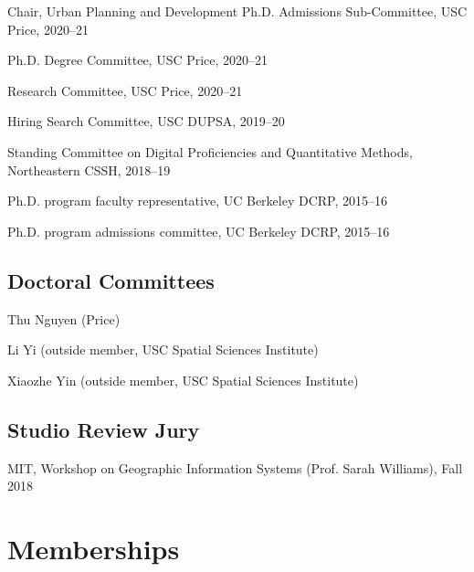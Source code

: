 \documentclass[12pt,letterpaper]{report}
\newcommand{\listitemspace}{0.25em}
\renewenvironment{itemize}
{\begin{list}{}{\setlength{\leftmargin}{0em}
                \setlength{\parskip}{0em}
                \setlength{\itemsep}{\listitemspace}
                \setlength{\parsep}{\listitemspace}}}
{\end{list}}
\begin{document}
    \begin{itemize}

        \item Chair, Urban Planning and Development Ph.D. Admissions Sub-Committee, USC Price, 2020--21
        \item Ph.D. Degree Committee, USC Price, 2020--21
        \item Research Committee, USC Price, 2020--21
        \item Hiring Search Committee, USC DUPSA, 2019--20
        \item Standing Committee on Digital Proficiencies and Quantitative Methods, Northeastern CSSH, 2018--19
        \item Ph.D. program faculty representative, UC Berkeley DCRP, 2015--16
        \item Ph.D. program admissions committee, UC Berkeley DCRP, 2015--16

    \end{itemize}

    \subsection*{Doctoral Committees}

    \begin{itemize}

        \item Thu Nguyen (Price)
        \item Li Yi (outside member, USC Spatial Sciences Institute)
        \item Xiaozhe Yin (outside member, USC Spatial Sciences Institute)

    \end{itemize}

    \subsection*{Studio Review Jury}

    \begin{itemize}

        \item MIT, Workshop on Geographic Information Systems (Prof. Sarah Williams), Fall 2018

    \end{itemize}



    \section*{Memberships}
\end{document}

